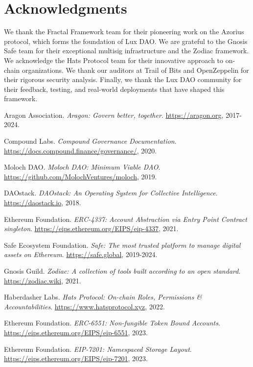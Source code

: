 \documentclass[11pt,a4paper]{article}
\begin{document}
\section*{Acknowledgments}

We thank the Fractal Framework team for their pioneering work on the Azorius protocol, which forms the foundation of Lux DAO. We are grateful to the Gnosis Safe team for their exceptional multisig infrastructure and the Zodiac framework. We acknowledge the Hats Protocol team for their innovative approach to on-chain organizations. We thank our auditors at Trail of Bits and OpenZeppelin for their rigorous security analysis. Finally, we thank the Lux DAO community for their feedback, testing, and real-world deployments that have shaped this framework.

\begin{thebibliography}{99}

Aragon Association.
\textit{Aragon: Govern better, together}.
\url{https://aragon.org}, 2017-2024.

Compound Labs.
\textit{Compound Governance Documentation}.
\url{https://docs.compound.finance/governance/}, 2020.

Moloch DAO.
\textit{Moloch DAO: Minimum Viable DAO}.
\url{https://github.com/MolochVentures/moloch}, 2019.

DAOstack.
\textit{DAOstack: An Operating System for Collective Intelligence}.
\url{https://daostack.io}, 2018.

Ethereum Foundation.
\textit{ERC-4337: Account Abstraction via Entry Point Contract singleton}.
\url{https://eips.ethereum.org/EIPS/eip-4337}, 2021.

Safe Ecosystem Foundation.
\textit{Safe: The most trusted platform to manage digital assets on Ethereum}.
\url{https://safe.global}, 2019-2024.

Gnosis Guild.
\textit{Zodiac: A collection of tools built according to an open standard}.
\url{https://zodiac.wiki}, 2021.

Haberdasher Labs.
\textit{Hats Protocol: On-chain Roles, Permissions \& Accountabilities}.
\url{https://www.hatsprotocol.xyz}, 2022.

Ethereum Foundation.
\textit{ERC-6551: Non-fungible Token Bound Accounts}.
\url{https://eips.ethereum.org/EIPS/eip-6551}, 2023.

Ethereum Foundation.
\textit{EIP-7201: Namespaced Storage Layout}.
\url{https://eips.ethereum.org/EIPS/eip-7201}, 2023.


\end{thebibliography}
\end{document}
